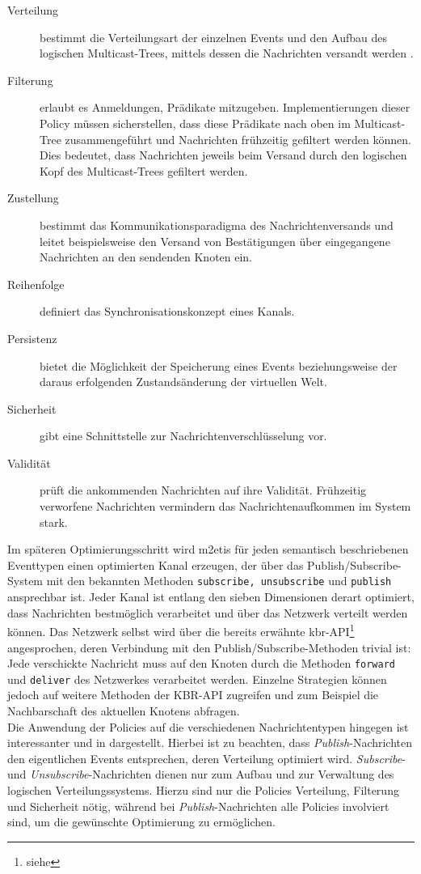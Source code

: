 \begin{description}
\item[Verteilung] bestimmt die Verteilungsart der einzelnen Events und den Aufbau des logischen Multicast-Trees, mittels dessen die Nachrichten versandt werden \cite{KostasKatrinis2005}.
\item[Filterung] erlaubt es Anmeldungen, Prädikate mitzugeben. Implementierungen dieser Policy müssen sicherstellen, dass diese Prädikate nach oben im Multicast-Tree zusammengeführt und Nachrichten frühzeitig gefiltert werden können. Dies bedeutet, dass Nachrichten jeweils beim Versand durch den logischen Kopf des Multicast-Trees gefiltert werden.
\item[Zustellung] bestimmt das Kommunikationsparadigma des Nachrichtenversands und leitet beispielsweise den Versand von Bestätigungen über eingegangene Nachrichten an den sendenden Knoten ein.
\item[Reihenfolge] definiert das Synchronisationskonzept eines Kanals.
\item[Persistenz] bietet die Möglichkeit der Speicherung eines Events beziehungsweise der daraus erfolgenden Zustandsänderung der virtuellen Welt.
\item[Sicherheit] gibt eine Schnittstelle zur Nachrichtenverschlüsselung vor.
\item[Validität] prüft die ankommenden Nachrichten auf ihre Validität. Frühzeitig verworfene Nachrichten vermindern das Nachrichtenaufkommen im System stark.
\end{description}

Im späteren Optimierungsschritt wird \ac{m2etis} für jeden semantisch beschriebenen Eventtypen einen optimierten Kanal erzeugen, der über das Publish/Subscribe-System mit den bekannten Methoden \texttt{subscribe, unsubscribe} und \texttt{publish} ansprechbar ist. Jeder Kanal ist entlang den sieben Dimensionen derart optimiert, dass Nachrichten bestmöglich verarbeitet und über das Netzwerk verteilt werden können. Das Netzwerk selbst wird über die bereits erwähnte \ac{kbr}-API\footnote{siehe } angesprochen, deren Verbindung mit den Publish/Subscribe-Methoden trivial ist: Jede verschickte Nachricht muss auf den Knoten durch die Methoden \texttt{forward} und \texttt{deliver} des Netzwerkes verarbeitet werden. Einzelne Strategien können jedoch auf weitere Methoden der KBR-API zugreifen und zum Beispiel die Nachbarschaft des aktuellen Knotens abfragen.\\
Die Anwendung der Policies auf die verschiedenen Nachrichtentypen hingegen ist interessanter und in  dargestellt. Hierbei ist zu beachten, dass \emph{Publish}-Nachrichten den eigentlichen Events entsprechen, deren Verteilung optimiert wird. \emph{Subscribe}- und \emph{Unsubscribe}-Nachrichten dienen nur zum Aufbau und zur Verwaltung des logischen Verteilungssystems. Hierzu sind nur die Policies Verteilung, Filterung und Sicherheit nötig, während bei \emph{Publish}-Nachrichten alle Policies involviert sind, um die gewünschte Optimierung zu ermöglichen.

